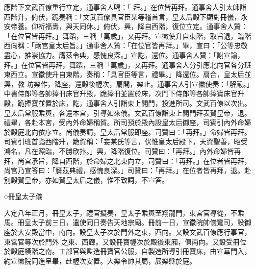 \begin{pinyinscope}
 應階下文武百僚重行立定，通事舍人喝：「
 拜。」在位皆再拜。通事舍人引太師詣西階升，俯伏，跪奏稱：「文武百僚具官臣某等稽首言，皇太后殿下顯對冊儀，永安帝養。仰祈福壽，與天同休。」俯伏，興，降自西階，復位立定。通事舍人贊：「在位官皆再拜。」舞蹈，三稱「萬歲」，又再拜。宣徽使升自東階，取旨退，臨階西向稱：「兩宮皇太后旨。」通事舍人贊：「在位官皆再拜。」畢，宣曰：「公等忠敬盡心，推崇協力。膺茲令典，感愧良深。」宣訖，還位。通事舍人贊：「謝宣諭，拜。」在位官皆再拜，舞蹈，三稱「萬歲」，又再拜。通事舍人分引應北向官各分班東西立。宣徽使升自東階，奏稱：「具官臣等言，禮畢。」降還位。扇合，皇太后並興，教
 坊樂作，降座，還殿後幄次，扇開，樂止。通事舍人引宣徽使奏：「解嚴。」中書侍郎等各帥捧冊床官升殿，跪捧冊並置於床，次門下侍郎等各帥捧寶床官升殿，跪捧寶並置於床，訖，通事舍人引詣東上閣門，投進所司。文武百僚以次出。皇太后常服乘輿，各還本宮，引導如來儀。文武百僚詣東上閣門拜表賀皇帝，退。禮畢，各赴本宮，受內外命婦稱賀。所司預於殿內設皇太后御座，司賓引內外命婦於殿庭北向依序立。尚儀奏請，皇太后常服即座。司贊曰：「再拜。」命婦皆再拜。司賓引班首詣西階升，跪賀稱：「妾某氏等言，伏惟皇太后殿下，天資聖善，昭受
 鴻名，凡在照臨，不勝欣抃。」興，降階復位。司贊曰：「再拜。」內外命婦皆再拜，尚宮承旨，降自西階，於命婦之北東向立，司贊曰：「再拜。」在位者皆再拜，尚宮乃宣答曰：「膺茲典禮，感愧良深。」司贊曰：「再拜。」在位者皆再拜，退。赴別殿賀皇帝，亦如賀皇太后之儀，惟不致詞，不宣答。



 ○冊皇太子儀



 大定八年正月，冊皇太子，禮官擬奏，皇太子乘輿至翔龍門，東宮官導從，不乘馬。冊皇太子前三日，遣使同日奏告天地宗廟。冊前一日，宣徽院帥儀鸞司，設御座於大安殿當中，南向。設皇太子次於門外之東，西向。又設文武百僚應行事官，東宮官等次於門外
 之東、西廊。又設冊寶幄次於殿後東廂，俱南向。又設受冊位於殿庭橫階之南。工部官與監造冊寶官公服，自製造所導引冊寶床，由宣華門入，約宣徽院同進呈畢，赴幄次安置。大樂令帥其屬，展樂縣於庭。




\end{pinyinscope}
